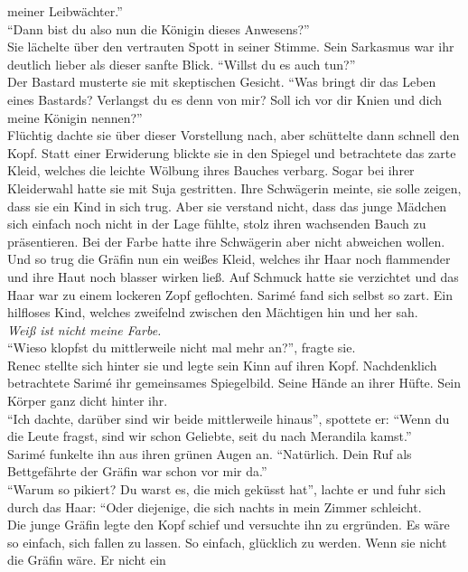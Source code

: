 meiner Leibwächter.''\\
``Dann bist du also nun die Königin dieses Anwesens?''\\
Sie lächelte über den vertrauten Spott in seiner Stimme. Sein Sarkasmus war ihr deutlich lieber als 
dieser sanfte Blick. ``Willst du es auch tun?''\\
Der Bastard musterte sie mit skeptischen Gesicht. ``Was bringt dir das Leben eines Bastards? 
Verlangst du es denn von mir? Soll ich vor dir Knien und dich meine Königin nennen?''\\
Flüchtig dachte sie über dieser Vorstellung nach, aber schüttelte dann schnell den Kopf.
Statt einer Erwiderung blickte sie in den Spiegel und betrachtete das zarte Kleid, welches die 
leichte Wölbung ihres Bauches verbarg. Sogar bei ihrer Kleiderwahl hatte sie mit Suja gestritten. 
Ihre Schwägerin meinte, sie solle zeigen, dass sie ein Kind in sich trug. Aber sie verstand nicht, dass das junge Mädchen 
sich einfach noch nicht in der Lage fühlte, stolz ihren wachsenden Bauch zu präsentieren. Bei der 
Farbe hatte ihre Schwägerin aber nicht abweichen wollen. Und so trug die Gräfin nun ein weißes Kleid, 
welches ihr Haar noch flammender und ihre Haut noch blasser wirken ließ. Auf Schmuck hatte sie 
verzichtet und das Haar war zu einem lockeren Zopf geflochten. Sarimé fand sich selbst so zart. Ein 
hilfloses Kind, welches zweifelnd zwischen den Mächtigen hin und her sah.\\
\textit{Weiß ist nicht meine Farbe.}\\
``Wieso klopfst du mittlerweile nicht mal mehr an?'', fragte sie.\\
Renec stellte sich hinter sie und legte sein Kinn auf ihren Kopf. Nachdenklich betrachtete 
Sarimé ihr gemeinsames Spiegelbild. Seine Hände an ihrer Hüfte. Sein Körper ganz dicht hinter 
ihr.\\
``Ich dachte, darüber sind wir beide mittlerweile hinaus'', spottete er: ``Wenn du die Leute fragst, sind wir schon Geliebte, seit du nach Merandila kamst.''\\
Sarimé funkelte ihn aus ihren grünen Augen an. ``Natürlich. Dein Ruf als Bettgefährte der Gräfin 
war schon vor mir da.''\\
``Warum so pikiert? Du warst es, die mich geküsst hat'', lachte er und fuhr sich durch das Haar: 
``Oder diejenige, die sich nachts in mein Zimmer schleicht.\\
Die junge Gräfin legte den Kopf schief und versuchte ihn zu ergründen. Es wäre so einfach, sich 
fallen zu lassen. So einfach, glücklich zu werden. Wenn sie nicht die Gräfin wäre. Er nicht ein 
